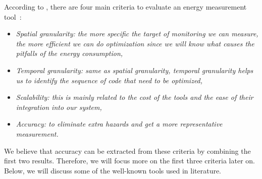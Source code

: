 According to \citeauthor{hackenberg2014hdeem}, there are four main criteria to evaluate an energy measurement tool~\cite{hackenberg2014hdeem}:
\begin{itemize}
    \item \em{Spatial granularity}: the more specific the target of monitoring we can measure, the more efficient we can do optimization since we will know what causes the pitfalls of the energy consumption,
    \item \em{Temporal granularity}: same as spatial granularity, temporal granularity helps us to identify the sequence of code that need to be optimized,
    \item \em{Scalability}: this is mainly related to the cost of the tools and the ease of their integration into our system,
    \item  \em{Accuracy}: to eliminate extra hazards and get a more representative measurement.
\end{itemize}

We believe that accuracy can be extracted from these criteria by combining the first two results. Therefore, we will focus more on the first three criteria later on.
Below, we will discuss some of the well-known tools used in literature.

